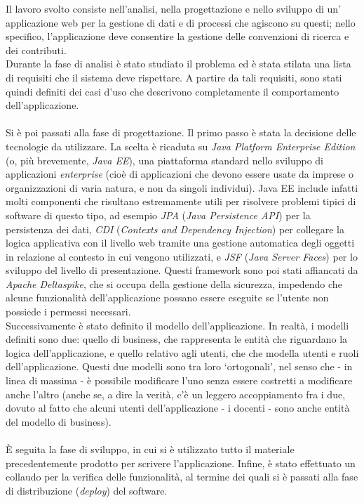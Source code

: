 Il lavoro svolto consiste nell'analisi, nella progettazione e nello sviluppo di un' applicazione web per la gestione di dati e di processi che agiscono su questi; nello specifico, l'applicazione deve consentire la gestione delle convenzioni di ricerca e dei contributi.\\
Durante la fase di analisi è stato studiato il problema ed è stata stilata una lista di requisiti che il sistema deve rispettare.
A partire da tali requisiti, sono stati quindi definiti dei casi d'uso che descrivono completamente il comportamento dell'applicazione.\\\\
Si è poi passati alla fase di progettazione. Il primo passo è stata la decisione delle tecnologie da utilizzare. La scelta è ricaduta su \textsl{Java Platform Enterprise Edition} (o, più brevemente, \textsl{Java EE}),
una piattaforma standard nello sviluppo di applicazioni \textit{enterprise} (cioè di applicazioni che devono essere usate da imprese o organizzazioni di varia natura, e non da singoli individui).
Java EE include infatti molti componenti che risultano estremamente utili per risolvere problemi tipici di software di questo tipo, ad esempio \textsl{JPA} (\textsl{Java Persistence API}) per la persistenza dei dati,
\textsl{CDI} (\textsl{Contexts and Dependency Injection}) per collegare la logica applicativa con il livello web tramite una gestione automatica degli oggetti in relazione al contesto in cui vengono utilizzati, e \textsl{JSF} 
(\textsl{Java Server Faces}) per lo sviluppo del livello di presentazione. Questi framework sono poi stati affiancati da \textsl{Apache 
Deltaspike}, che si occupa della gestione della sicurezza, impedendo che alcune funzionalità dell'applicazione  possano essere eseguite se l'utente non possiede i permessi necessari.\\
Successivamente è stato definito il modello dell'applicazione. In realtà, i modelli definiti sono due: quello di business, che rappresenta le entità che riguardano la logica dell'applicazione, e quello relativo agli utenti,
che che modella utenti e ruoli dell'applicazione. Questi due modelli sono tra loro \textquoteleft ortogonali\textquoteright{}, nel senso che - in linea di massima - è possibile modificare l'uno senza essere costretti a modificare anche l'altro (anche se, a dire la verità, c'è un leggero accoppiamento fra i due, dovuto al fatto che alcuni utenti dell'applicazione - i docenti - sono anche entità del modello di business).\\
\\
È seguita la fase di sviluppo, in cui si è utilizzato tutto il materiale precedentemente prodotto per scrivere l'applicazione. Infine, è stato effettuato un collaudo per la verifica delle funzionalità, al termine dei quali si è passati alla fase di distribuzione (\textit{deploy}) del software.\\
\\
